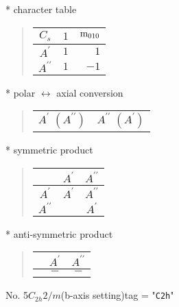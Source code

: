 \documentclass[fleqn,10pt,landscape]{jsarticle}
\begin{document}
* character table
\begin{quote}
\begin{tabular}{crr} \hline \hline
$ C_{s} $ & $ 1 $ & $ {\rm m}_{010} $ \\ \hline
$ A^{\prime} $ & $ 1 $ & $ 1 $ \\
$ A^{\prime\prime} $ & $ 1 $ & $ -1 $ \\
 \hline \hline
\end{tabular}
\end{quote}
* polar $\leftrightarrow$ axial conversion
\begin{quote}
\begin{tabular}{cc}
$ A^{\prime}\,\,(A^{\prime\prime}) $ & $ A^{\prime\prime}\,\,(A^{\prime}) $
\end{tabular}
\end{quote}
* symmetric product
\begin{quote}
\begin{tabular}{c|cc} \hline \hline
 & $ A^{\prime} $ & $ A^{\prime\prime} $ \\ \hline
$ A^{\prime} $ & $ A^{\prime} $ & $ A^{\prime\prime} $ \\
$ A^{\prime\prime} $ & $  $ & $ A^{\prime} $ \\
 \hline \hline
\end{tabular}
\end{quote}
* anti-symmetric product
\begin{quote}
\begin{tabular}{ccc} \hline \hline
 & $ A^{\prime} $ & $ A^{\prime\prime} $ \\ \hline
$  $ & $ - $ & $ - $ \\
 \hline \hline
\end{tabular}
\end{quote}
\newpage
No. 5\quad$C_{2h}$\quad$2/m$\quad(b-axis setting)\quad[ monoclinic ]
tag = "{\tt C2h}"
\end{document}
